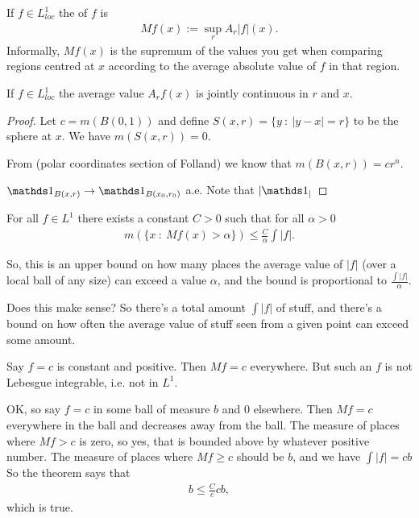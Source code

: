 \begin{definition}
  If $f \in L^1_{loc}$ the  of $f$ is
  \begin{align*}
    M f(x) := \sup_r A_r |f|(x).
  \end{align*}
  Informally, $M f(x)$ is the supremum of the values you get when comparing regions centred at $x$ according to
  the average absolute value of $f$ in that region.
\end{definition}

\begin{lemma}
  If $f \in L^1_{loc}$ the average value $A_r f(x)$ is jointly continuous in $r$ and $x$.
\end{lemma}

\begin{proof}
  Let $c = m(B(0, 1))$ and define $S(x, r) = \{y ~:~ |y - x| = r\}$ to be the sphere at $x$. We have $m(S(x, r)) = 0$.

  From (polar coordinates section of Folland) we know that $m(B(x, r)) = cr^n$.

  $\ind_{B(x, r)} \to \ind_{B(x_0, r_0)}$ a.e. Note that $|\ind_|$
\end{proof}

\begin{theorem}
  For all $f \in L^1$ there exists a constant $C > 0$ such that for all $\alpha > 0$
  \begin{align*}
    m(\{x ~:~ M f(x) > \alpha\}) \leq \frac{C}{\alpha}\int |f|.
  \end{align*}
\end{theorem}

\begin{intuition*}
  So, this is an upper bound on how many places the average value of $|f|$ (over a local ball of any size) can
  exceed a value $\alpha$, and the bound is proportional to $\frac{\int |f|}{\alpha}$.

  Does this make sense? So there's a total amount $\int |f|$ of stuff, and there's a bound on how often the
  average value of stuff seen from a given point can exceed some amount.

  Say $f = c$ is constant and positive. Then $M f = c$ everywhere. But such an $f$ is not Lebesgue integrable,
  i.e. not in $L^1$.

  OK, so say $f = c$ in some ball of measure $b$ and $0$ elsewhere. Then $Mf = c$ everywhere in the ball and decreases away
  from the ball. The measure of places where $Mf > c$ is zero, so yes, that is bounded above by whatever
  positive number. The measure of places where $Mf \geq c$ should be $b$, and we have $\int |f| = cb$ So the theorem says that
  \begin{align*}
    b \leq \frac{C}{c} cb,
  \end{align*}
  which is true.
\end{intuition*}

